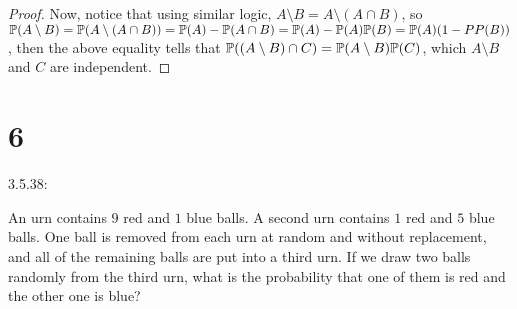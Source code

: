 \documentclass{article}
\begin{document}
\begin{proof}
    Now, notice that using similar logic, $A\setminus B=A\setminus (A\cap B)$, so $\mathbb{P}(A\setminus B)=\mathbb{P}(A\setminus (A\cap B))=\mathbb{P}(A)-\mathbb{P}(A\cap B)=\mathbb{P}(A)-\mathbb{P}(A)\mathbb{P}(B)=\mathbb{P}(A)(1-PP(B))$, then the above equality tells that $\mathbb{P}((A\setminus B)\cap C)=\mathbb{P}(A\setminus B)\mathbb{P}(C)$, which $A\setminus B$ and $C$ are independent.
\end{proof}

\hfil
\section*{6}
\begin{ques}\label{q6}
    3.5.38:

    An urn contains $9$ red and $1$ blue balls. A second urn contains $1$ red and $5$ blue balls. One ball is removed from each urn at random and without replacement, and all of the remaining balls are put into a third urn. If we draw two balls randomly from the third urn, what is the probability that one of them is red and the other one is blue?
\end{ques}
\end{document}
